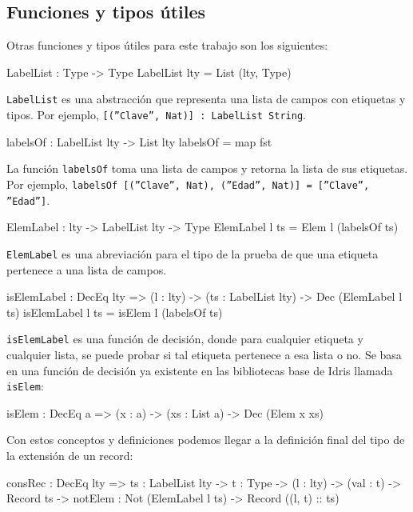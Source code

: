 \subsection{Funciones y tipos útiles}

Otras funciones y tipos útiles para este trabajo son los siguientes:

\begin{code}
LabelList : Type -> Type
LabelList lty = List (lty, Type)
\end{code}

\texttt{LabelList} es una abstracción que representa una lista de campos con etiquetas y tipos. Por ejemplo, \texttt{[(''Clave'', Nat)] : LabelList String}.

\begin{code}
labelsOf : LabelList lty -> List lty
labelsOf = map fst
\end{code}

La función \texttt{labelsOf} toma una lista de campos y retorna la lista de sus etiquetas. Por ejemplo, \texttt{labelsOf [(''Clave'', Nat), (''Edad'', Nat)] = [''Clave'', ''Edad'']}.

\begin{code}
ElemLabel : lty -> LabelList lty -> Type
ElemLabel l ts = Elem l (labelsOf ts)
\end{code}

\texttt{ElemLabel} es una abreviación para el tipo de la prueba de que una etiqueta pertenece a una lista de campos.

\begin{code}
isElemLabel : DecEq lty => (l : lty) ->
  (ts : LabelList lty) ->
  Dec (ElemLabel l ts)
isElemLabel l ts = isElem l (labelsOf ts)
\end{code}

\texttt{isElemLabel} es una función de decisión, donde para cualquier etiqueta y cualquier lista, se puede probar si tal etiqueta pertenece a esa lista o no. Se basa en una función de decisión ya existente en las bibliotecas base de Idris llamada \texttt{isElem}:

\begin{code}
isElem : DecEq a => (x : a) -> (xs : List a) ->
  Dec (Elem x xs)
\end{code}

Con estos conceptos y definiciones podemos llegar a la definición final del tipo de la extensión de un record:

\begin{code}
consRec : DecEq lty => {ts : LabelList lty} ->
  {t : Type} -> (l : lty) -> (val : t) ->
  Record ts -> {notElem : Not (ElemLabel l ts)} ->
  Record ((l, t) :: ts)
\end{code}

